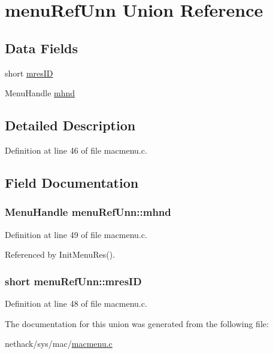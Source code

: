 \hypertarget{unionmenuRefUnn}{\section{menu\+Ref\+Unn Union Reference}
\label{unionmenuRefUnn}
}
\subsection*{Data Fields}
\begin{DoxyCompactItemize}
\item 
short \hyperlink{unionmenuRefUnn_ad50ef00947e4c6d7d73e4abf56aafff0}{mres\+I\+D}
\item 
Menu\+Handle \hyperlink{unionmenuRefUnn_a3aca78ac67b7292a8a593d0fb2d9dccf}{mhnd}
\end{DoxyCompactItemize}


\subsection{Detailed Description}


Definition at line 46 of file macmenu.\+c.



\subsection{Field Documentation}
\hypertarget{unionmenuRefUnn_a3aca78ac67b7292a8a593d0fb2d9dccf}{
\subsubsection[{mhnd}]{\setlength{\rightskip}{0pt plus 5cm}Menu\+Handle menu\+Ref\+Unn\+::mhnd}}\label{unionmenuRefUnn_a3aca78ac67b7292a8a593d0fb2d9dccf}


Definition at line 49 of file macmenu.\+c.



Referenced by Init\+Menu\+Res().

\hypertarget{unionmenuRefUnn_ad50ef00947e4c6d7d73e4abf56aafff0}{
\subsubsection[{mres\+I\+D}]{\setlength{\rightskip}{0pt plus 5cm}short menu\+Ref\+Unn\+::mres\+I\+D}}\label{unionmenuRefUnn_ad50ef00947e4c6d7d73e4abf56aafff0}


Definition at line 48 of file macmenu.\+c.



The documentation for this union was generated from the following file\+:\begin{DoxyCompactItemize}
\item 
nethack/sys/mac/\hyperlink{macmenu_8c}{macmenu.\+c}\end{DoxyCompactItemize}
